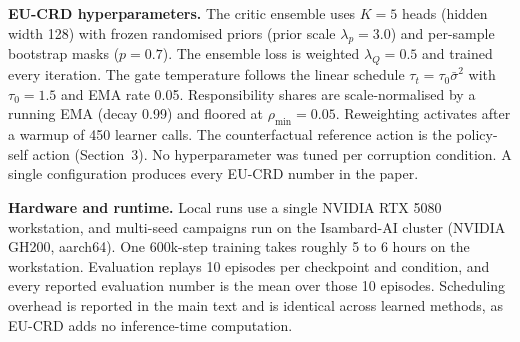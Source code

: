 \textbf{EU-CRD hyperparameters.} The critic ensemble uses $K=5$ heads (hidden width 128) with frozen randomised priors (prior scale $\lambda_p=3.0$) and per-sample bootstrap masks ($p=0.7$). The ensemble loss is weighted $\lambda_Q{=}0.5$ and trained every iteration. The gate temperature follows the linear schedule $\tau_t=\tau_0\bar\sigma^2$ with $\tau_0=1.5$ and EMA rate 0.05. Responsibility shares are scale-normalised by a running EMA (decay 0.99) and floored at $\rho_{\min}=0.05$. Reweighting activates after a warmup of 450 learner calls. The counterfactual reference action is the policy-self action (Section~3). No hyperparameter was tuned per corruption condition. A single configuration produces every EU-CRD number in the paper.

\textbf{Hardware and runtime.} Local runs use a single NVIDIA RTX 5080 workstation, and multi-seed campaigns run on the Isambard-AI cluster (NVIDIA GH200, aarch64). One 600k-step training takes roughly 5 to 6 hours on the workstation. Evaluation replays 10 episodes per checkpoint and condition, and every reported evaluation number is the mean over those 10 episodes. Scheduling overhead is reported in the main text and is identical across learned methods, as EU-CRD adds no inference-time computation.

